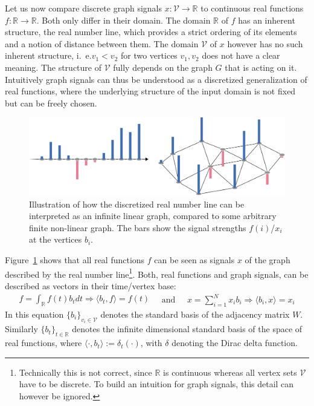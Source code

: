 Let us now compare discrete graph signals $x: \mathcal{V} \to \mathbb{R}$ to continuous real functions $f: \mathbb{R} \to \mathbb{R}$.
Both only differ in their domain.
The domain $\mathbb{R}$ of $f$ has an inherent structure, the real number line, which provides a strict ordering of its elements and a notion of distance between them.
The domain $\mathcal{V}$ of $x$ however has no such inherent structure, i.~e.\@ $v_1 < v_2$ for two vertices $v_1, v_2$ does not have a clear meaning.
The structure of $\mathcal{V}$ fully depends on the graph $G$ that is acting on it.
Intuitively graph signals can thus be understood as a discretized generalization of real functions, where the underlying structure of the input domain is not fixed but can be freely chosen.
\begin{figure}
	\centering
	\includegraphics[width=0.9\linewidth]{gfx/sgt/real-graph.pdf}
	\caption{
		Illustration of how the discretized real number line can be interpreted as an infinite linear graph, compared to some arbitrary finite non-linear graph.
		The bars show the signal strengths $f(i)$/$x_i$ at the vertices $b_i$.
	}\label{fig:sgt:real-graph}
\end{figure}
Figure~\ref{fig:sgt:real-graph} shows that all real functions $f$ can be seen as signals $x$ of the graph described by the real number line\footnote{
	Technically this is not correct, since $\mathbb{R}$ is continuous whereas all vertex sets $\mathcal{V}$ have to be discrete.
	To build an intuition for graph signals, this detail can however be ignored.
}.
Both, real functions and graph signals, can be described as vectors in their time/vertex base:
\begin{equation}
	\begin{split}
		f = \int_{\mathbb{R}} f(t) b_t dt
		\Rightarrow \langle b_t, f \rangle = f(t)
	\end{split}
	\quad\text{and}\quad
	\begin{split}
		x = \sum_{i = 1}^{N} x_i b_i
		\Rightarrow \langle b_i, x \rangle = x_i
	\end{split}
\end{equation}
In this equation ${\{ b_i \}}_{v_i \in \mathcal{V}}$ denotes the standard basis of the adjacency matrix $W$.
Similarly ${\{ b_t \}}_{t \in \mathbb{R}}$ denotes the infinite dimensional standard basis of the space of real functions, where $\langle \cdot, b_t \rangle := \delta_t(\cdot)$, with $\delta$ denoting the Dirac delta function.

